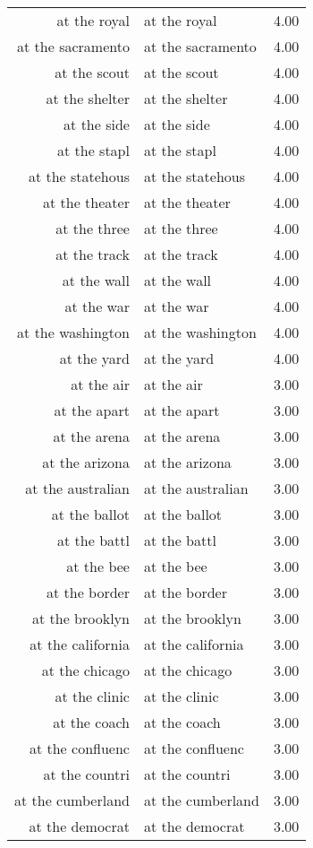 \begin{table}[ht]
\begin{tabular}{rlr}
  at the royal & at the royal & 4.00 \\ 
  at the sacramento & at the sacramento & 4.00 \\ 
  at the scout & at the scout & 4.00 \\ 
  at the shelter & at the shelter & 4.00 \\ 
  at the side & at the side & 4.00 \\ 
  at the stapl & at the stapl & 4.00 \\ 
  at the statehous & at the statehous & 4.00 \\ 
  at the theater & at the theater & 4.00 \\ 
  at the three & at the three & 4.00 \\ 
  at the track & at the track & 4.00 \\ 
  at the wall & at the wall & 4.00 \\ 
  at the war & at the war & 4.00 \\ 
  at the washington & at the washington & 4.00 \\ 
  at the yard & at the yard & 4.00 \\ 
  at the air & at the air & 3.00 \\ 
  at the apart & at the apart & 3.00 \\ 
  at the arena & at the arena & 3.00 \\ 
  at the arizona & at the arizona & 3.00 \\ 
  at the australian & at the australian & 3.00 \\ 
  at the ballot & at the ballot & 3.00 \\ 
  at the battl & at the battl & 3.00 \\ 
  at the bee & at the bee & 3.00 \\ 
  at the border & at the border & 3.00 \\ 
  at the brooklyn & at the brooklyn & 3.00 \\ 
  at the california & at the california & 3.00 \\ 
  at the chicago & at the chicago & 3.00 \\ 
  at the clinic & at the clinic & 3.00 \\ 
  at the coach & at the coach & 3.00 \\ 
  at the confluenc & at the confluenc & 3.00 \\ 
  at the countri & at the countri & 3.00 \\ 
  at the cumberland & at the cumberland & 3.00 \\ 
  at the democrat & at the democrat & 3.00 \\ 

\end{tabular}
\end{table}
